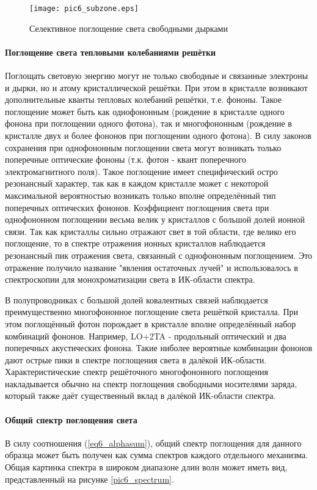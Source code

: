 \begin{figure}[h!]\centering
\texttt{[image: pic6\_subzone.eps]}
\caption{Селективное поглощение света свободными дырками}
\label{pic6_subzone}
\end{figure}

\paragraph{Поглощение света тепловыми колебаниями решётки}
Поглощать световую энергию могут не только свободные и связанные электроны и дырки, но и атому кристаллической решётки. При этом в кристалле возникают дополнительные кванты тепловых колебаний решётки, т.е. фононы. Такое поглощение может быть как однофононным (рождение в кристалле одного фонона при поглощении одного фотона), так и многофононным (рождение в кристалле двух и более фононов при поглощении одного фотона). В силу законов сохранения при однофононным поглощении света могут возникать только поперечные оптические фононы (т.к. фотон - квант поперечного электромагнитного поля). Такое поглощение имеет специфический остро резонансный характер, так как в каждом кристалле может с некоторой максимальной вероятностью возникать только вполне определённый тип поперечных оптических фононов. Коэффициент поглощения света при однофононном поглощении весьма велик у кристаллов с большой долей ионной связи. Так как кристаллы сильно отражают свет в той области, где велико его поглощение, то в спектре отражения ионных кристаллов наблюдается резонансный пик отражения света, связанный с однофононным поглощением. Это отражение получило название "явления остаточных лучей" и использовалось в спектроскопии для монохроматизации света в ИК-области спектра.

В полупроводниках с большой долей ковалентных связей наблюдается преимущественно многофононное поглощение света решёткой кристалла. При этом поглощённый фотон порождает в кристалле вполне определённый набор комбинаций фононов. Например, LO+2TA - продольный оптический и два поперечных акустических фонона. Такие ниболее вероятные комбинации фононов дают острые пики в спектре поглощения света в далёкой ИК-области. Характеристические спектр решёточного многофононного поглощения накладывается обычно на спектр поглощения свободными носителями заряда, который также даёт существенный вклад в далёкой ИК-области спектра.

\paragraph{Общий спектр поглощения света}
В силу соотношения (\ref{eq6_alphasum}), общий спектр поглощения для данного образца может быть получен как сумма спектров каждого отдельного механизма. Общая картинка спектра в широком диапазоне длин волн может иметь вид, представленный на рисунке \ref{pic6_spectrum}.

